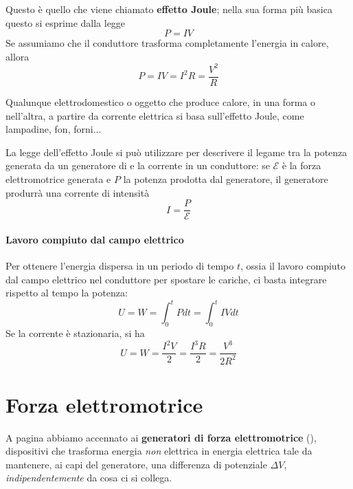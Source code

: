 Questo è quello che viene chiamato \textbf{effetto Joule}; nella sua forma più basica questo si esprime dalla legge
\begin{equation}
	P=IV
\end{equation}
Se assumiamo che il conduttore trasforma completamente l'energia in calore, allora
\begin{equation}
	P=IV=I^2R=\frac{V^2}{R}
\end{equation}
\begin{example}
	Qualunque elettrodomestico o oggetto che produce calore, in una forma o nell'altra, a partire da corrente elettrica si basa sull'effetto Joule, come lampadine, fon, forni...
\end{example}
\begin{observe}
	La legge dell'effetto Joule si può utilizzare per descrivere il legame tra la potenza generata da un generatore di \fem e la corrente in un conduttore: se $\mathcal{E}$ è la forza elettromotrice generata e $P$ la potenza prodotta dal generatore, il generatore produrrà una corrente di intensità
	\begin{equation}
		I=\frac{P}{\mathcal{E}}
	\end{equation}
\end{observe}
\paragraph{Lavoro compiuto dal campo elettrico}
Per ottenere l'energia dispersa in un periodo di tempo $t$, ossia il lavoro compiuto dal campo elettrico nel conduttore per spostare le cariche, ci basta integrare rispetto al tempo la potenza:
\begin{equation}
	U=W=\int_{0}^{t}Pdt=\int_{0}^t IVdt
\end{equation}
Se la corrente è stazionaria, si ha
\begin{equation}
	U=W=\frac{I^2V}{2}=\frac{I^3R}{2}=\frac{V^3}{2R^2}
\end{equation}
\section{Forza elettromotrice}\label{femxesteso}
A pagina \pageref{fem} abbiamo accennato ai \textbf{generatori di forza elettromotrice} (\fem), dispositivi che trasforma energia \textit{non} elettrica in energia elettrica tale da mantenere, ai capi del generatore, una differenza di potenziale $\Delta V$, \textit{indipendentemente} da cosa ci si collega.

